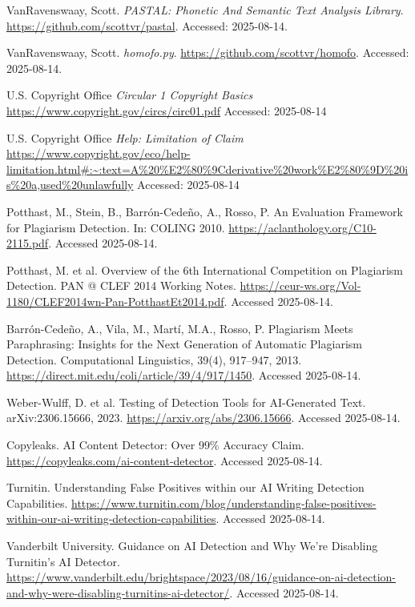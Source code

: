 \documentclass[12pt]{article}
\begin{document}
\begin{thebibliography}{9}

VanRavenswaay, Scott.
\emph{PASTAL: Phonetic And Semantic Text Analysis Library}.
\url{https://github.com/scottvr/pastal}.
Accessed: 2025-08-14.

VanRavenswaay, Scott.
\emph{homofo.py}.
\url{https://github.com/scottvr/homofo}.
Accessed: 2025-08-14.

U.S. Copyright Office
\emph{Circular 1 Copyright Basics}
\url{https://www.copyright.gov/circs/circ01.pdf}
Accessed: 2025-08-14

U.S. Copyright Office
\emph{Help: Limitation of Claim}
\url{https://www.copyright.gov/eco/help-limitation.html#:~:text=A%20%E2%80%9Cderivative%20work%E2%80%9D%20is%20a,used%20unlawfully}
Accessed: 2025-08-14

Potthast, M., Stein, B., Barrón-Cedeño, A., Rosso, P.
An Evaluation Framework for Plagiarism Detection.
In: COLING 2010. 
\url{https://aclanthology.org/C10-2115.pdf}. 
Accessed 2025-08-14. 

Potthast, M. et al.
Overview of the 6th International Competition on Plagiarism Detection.
PAN @ CLEF 2014 Working Notes. 
\url{https://ceur-ws.org/Vol-1180/CLEF2014wn-Pan-PotthastEt2014.pdf}. Accessed 2025-08-14.

Barrón-Cedeño, A., Vila, M., Martí, M.A., Rosso, P.
Plagiarism Meets Paraphrasing: Insights for the Next Generation of Automatic Plagiarism Detection.
Computational Linguistics, 39(4), 917–947, 2013.
\url{https://direct.mit.edu/coli/article/39/4/917/1450}. Accessed 2025-08-14.

Weber-Wulff, D. et al.
Testing of Detection Tools for AI-Generated Text.
arXiv:2306.15666, 2023.
\url{https://arxiv.org/abs/2306.15666}. Accessed 2025-08-14.

Copyleaks.
AI Content Detector: Over 99\% Accuracy Claim.
\url{https://copyleaks.com/ai-content-detector}. Accessed 2025-08-14.

Turnitin.
Understanding False Positives within our AI Writing Detection Capabilities.
\url{https://www.turnitin.com/blog/understanding-false-positives-within-our-ai-writing-detection-capabilities}. Accessed 2025-08-14.

Vanderbilt University.
Guidance on AI Detection and Why We’re Disabling Turnitin’s AI Detector.
\url{https://www.vanderbilt.edu/brightspace/2023/08/16/guidance-on-ai-detection-and-why-were-disabling-turnitins-ai-detector/}. Accessed 2025-08-14.


\end{thebibliography}
\end{document}
